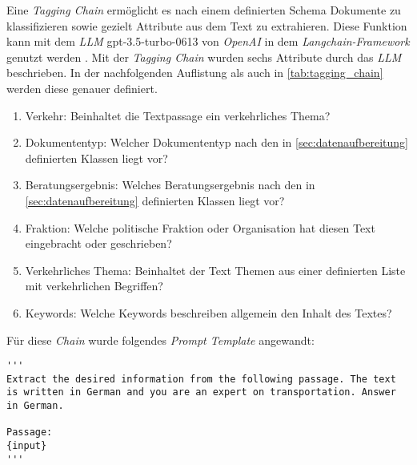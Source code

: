 Eine \textit{Tagging Chain} ermöglicht es nach einem definierten Schema Dokumente zu klassifizieren sowie gezielt Attribute aus dem Text zu extrahieren. Diese Funktion kann mit dem \textit{LLM} {gpt-3.5-turbo-0613} von \textit{OpenAI} in dem \textit{Langchain-Framework} genutzt werden \parencite{langchainb}. Mit der \textit{Tagging Chain} wurden sechs Attribute durch das \textit{LLM} beschrieben. In der nachfolgenden Auflistung als auch in \autoref{tab:tagging_chain} werden diese genauer definiert.
\begin{enumerate}
    \item Verkehr: Beinhaltet die Textpassage ein verkehrliches Thema?
    \item Dokumententyp: Welcher Dokumententyp nach den in \autoref{sec:datenaufbereitung} definierten Klassen liegt vor?
    \item Beratungsergebnis: Welches Beratungsergebnis nach den in \autoref{sec:datenaufbereitung} definierten Klassen liegt vor?
    \item Fraktion: Welche politische Fraktion oder Organisation hat diesen Text eingebracht oder geschrieben?
    \\
    \item Verkehrliches Thema: Beinhaltet der Text Themen aus einer definierten Liste mit verkehrlichen Begriffen?
    \item Keywords: Welche Keywords beschreiben allgemein den Inhalt des Textes?
\end{enumerate}



\begin{minipage}{\linewidth}
Für diese \textit{Chain} wurde folgendes \textit{Prompt Template} angewandt:
\begin{lstlisting}
'''
Extract the desired information from the following passage. The text is written in German and you are an expert on transportation. Answer in German.

Passage:
{input}
'''
\end{lstlisting}
\end{minipage}

